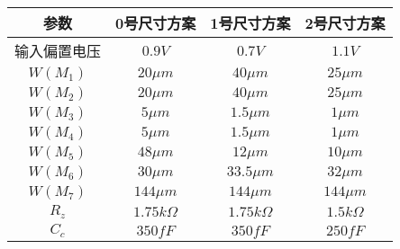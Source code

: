 \begin{table}[!htbp]
	\centering
	\begin{tabular}{c|c|c|c}
		\hline
		        参数          &     0号尺寸方案     &     1号尺寸方案     &    2号尺寸方案     \\ \hline
		      输入偏置电压        &    $0.9 V$     &    $0.7 V$     &    $1.1 V$    \\
		$W\left(M_1\right)$ &   $20 \mu m$   &   $40 \mu m$   &  $25 \mu m$   \\
		$W\left(M_2\right)$ &   $20 \mu m$   &   $40 \mu m$   &  $25 \mu m$   \\
		$W\left(M_3\right)$ &   $5 \mu m$    &  $1.5 \mu m$   &   $1 \mu m$   \\
		$W\left(M_4\right)$ &   $5 \mu m$    &  $1.5 \mu m$   &   $1 \mu m$   \\
		$W\left(M_5\right)$ &   $48 \mu m$   &   $12 \mu m$   &  $10 \mu m$   \\
		$W\left(M_6\right)$ &   $30 \mu m$   &  $33.5 \mu m$  &  $32 \mu m$   \\
		$W\left(M_7\right)$ &  $144 \mu m$   &  $144 \mu m$   &  $144 \mu m$  \\
		       $R_z$        & $1.75 k\Omega$ & $1.75 k\Omega$ & $1.5 k\Omega$ \\
		       $C_c$        &    $350 fF$    &    $350 fF$    &   $250 fF$    \\ \hline
	\end{tabular}
\end{table}

